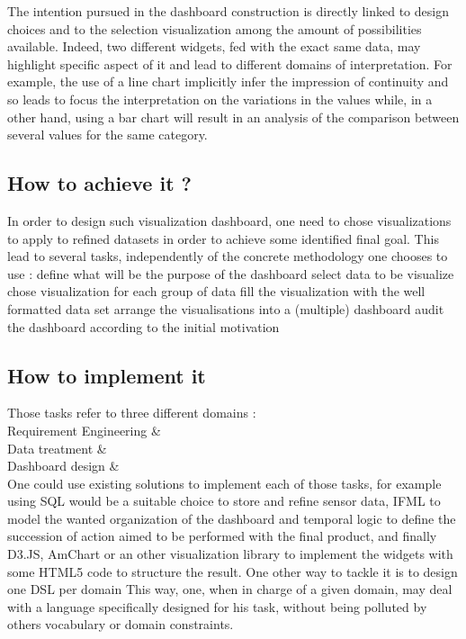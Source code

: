 \documentclass{acm_proc_article-sp}
\begin{document}
The intention pursued in the dashboard construction is directly linked to design
choices and to the selection visualization among the amount of possibilities available.
Indeed, two different widgets, fed with the exact same data, may highlight specific
aspect of it and lead to different domains of interpretation. For example,
the use of a line chart implicitly infer the impression of continuity and so leads
to focus the interpretation on the variations in the values while, in a other hand,
using a bar chart will result in an analysis of the comparison between several values
for the same category.

\subsection{How to achieve it ?}
In order to design such visualization dashboard, one need to chose visualizations
to apply to refined datasets in order to achieve some identified final goal.
This lead to several tasks, independently of the concrete methodology one chooses to use :
 define what will be the purpose of the dashboard
 select data to be visualize
 chose visualization for each group of data
 fill the visualization with the well formatted data set
 arrange the visualisations into a (multiple) dashboard
 audit the dashboard according to the initial motivation

\subsection{How to implement it}
Those tasks refer to three different domains :\\
Requirement Engineering  \& \\
Data treatment  \& \\
Dashboard design  \& \\
One could use existing solutions to implement each of those tasks, for example
using SQL would be a suitable choice to store and refine sensor data, IFML to
model the wanted organization of the dashboard and temporal logic to define
the succession of action aimed to be performed with the final product, and finally
D3.JS, AmChart or an other visualization library to implement the widgets
with some HTML5 code to structure the result.
One other way to tackle it is to design one DSL per domain
This way, one, when in charge of a given domain, may deal with a language
specifically designed for his task, without being polluted by others
vocabulary or domain constraints.
\end{document}
